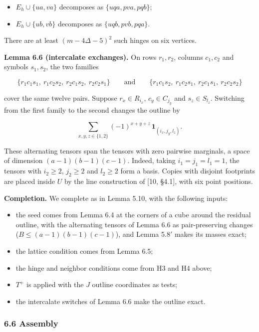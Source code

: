 \documentclass[english,11pt,a4paper]{article}
\providecommand{\tightlist}{\setlength{\itemsep}{0pt}\setlength{\parskip}{0pt}}
\begin{document}
\begin{itemize}
\tightlist
\item
  \(E_h\cup\{ua,va\}\) decomposes as \(\{uqa,pva,pqb\}\);
\item
  \(E_h\cup\{ub,vb\}\) decomposes as \(\{uqb,pvb,pqa\}\).
\end{itemize}

There are at least \((m-4\Delta-5)^2\) such hinges on six vertices.

\textbf{Lemma 6.6 (intercalate exchanges).} On rows \(r_1,r_2\), columns \(c_1,c_2\) and symbols \(s_1,s_2\), the two families

\nopagebreak[4]
\[\{r_1c_1s_1,\ r_1c_2s_2,\ r_2c_1s_2,\ r_2c_2s_1\}\qquad\text{and}\qquad\{r_1c_1s_2,\ r_1c_2s_1,\ r_2c_1s_1,\ r_2c_2s_2\}\]

cover the same twelve pairs. Suppose \(r_x\in R_{i_x}\), \(c_y\in C_{j_y}\) and \(s_z\in S_{l_z}\). Switching from the first family to the second changes the outline by

\nopagebreak[4]
\[\sum_{x,y,z\in\{1,2\}}(-1)^{x+y+z}\,\mathbf 1_{(i_x,j_y,l_z)}.\]

These alternating tensors span the tensors with zero pairwise marginals, a space of dimension \((a-1)(b-1)(c-1)\). Indeed, taking \(i_1=j_1=l_1=1\), the tensors with \(i_2\ge2\), \(j_2\ge2\) and \(l_2\ge2\) form a basis. Copies with disjoint footprints are placed inside \(U\) by the line construction of {[}10, §4.1{]}, with six point positions.

\textbf{Completion.} We complete as in Lemma 5.10, with the following inputs:

\begin{itemize}
\tightlist
\item
  the seed comes from Lemma 6.4 at the corners of a cube around the residual outline, with the alternating tensors of Lemma 6.6 as pair-preserving changes (\(B\le(a-1)(b-1)(c-1)\)), and Lemma 5.8\('\) makes its masses exact;
\item
  the lattice condition comes from Lemma 6.5;
\item
  the hinge and neighbor conditions come from H3 and H4 above;
\item
  \(T^+\) is applied with the \(J\) outline coordinates as tests;
\item
  the intercalate switches of Lemma 6.6 make the outline exact.
\end{itemize}

\subsubsection{6.6 Assembly}\label{assembly}
\end{document}
